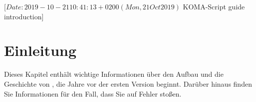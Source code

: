 %
%
%
%
%
%
%
%
% 
%
%
%
%

                 [$Date: 2019-10-21 10:41:13 +0200 (Mon, 21 Oct 2019) $
                  KOMA-Script guide introduction]

\chapter{Einleitung}

Dieses Kapitel enthält wichtige Informationen über
den Aufbau  und die Geschichte von
\KOMAScript, die Jahre vor der ersten Version beginnt. Darüber hinaus finden
Sie Informationen für den Fall, dass Sie %
\iffalse %
 \KOMAScript{} noch nicht installiert haben, oder %
\fi%
auf Fehler stoßen.

